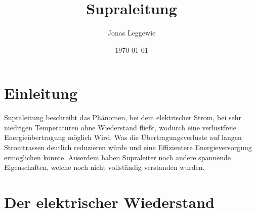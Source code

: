 \documentclass[a4paper,12pt]{article}
\title{Supraleitung}
\author{Jonas Leggewie}
\date{\today}
\begin{document}
\maketitle
\newpage
\tableofcontents
\newpage


\section{Einleitung}
Supraleitung beschreibt das Phänomen, bei dem elektrischer Strom, bei sehr niedrigen Temperaturen 
ohne Wiederstand fließt, wodurch eine verlustfreie Energieübertragung möglich Wird. Was die 
Übertragungsverluste auf langen Stromtrassen deutlich reduzieren würde und eine Effizientere 
Energieversorgung ermöglichen könnte. Auserdem haben Supraleiter noch andere spannende 
Eigenschaften, welche noch nicht vollständig verstanden wurden. 

\section{Der elektrischer Wiederstand}
\end{document}
